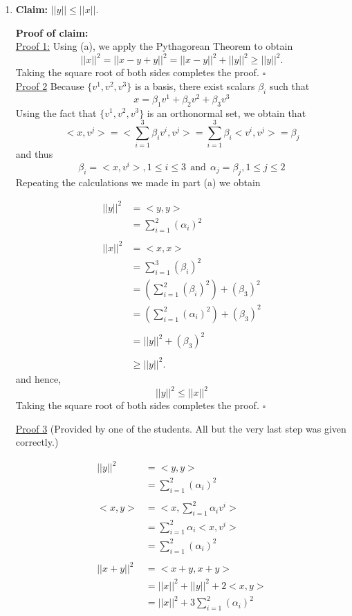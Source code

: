 \documentclass[letterpaper]{article}
\begin{document}
\begin{enumerate}
\newpage
\item \textbf{Claim:} $||y|| \le ||x|| $.


\textbf{Proof of claim:} \\
\noindent \underline{Proof 1:} Using (a), we apply the Pythagorean Theorem to obtain
$$||x||^2 = ||x-y + y||^2= ||x-y||^2 + ||y||^2 \ge ||y||^2.$$
Taking the square root of both sides completes the proof.
\hfill $\square$ \\

\noindent \underline{Proof 2} Because $\{v^1, v^2, v^3\}$ is a basis, there exist scalars $\beta_i$ such that
$$x=\beta_1 v^1 + \beta_2 v^2 + \beta_3 v^3$$
Using the fact that $\{v^1, v^2, v^3\}$ is an orthonormal set, we obtain that
$$<x,v^j> = <\sum_{i=1}^3 \beta_i v^i, v^j> = \sum_{i=1}^3 \beta_i< v^i, v^j> = \beta_j$$
and thus $$ \beta_i = <x,v^i>, 1\le i \le 3 ~~ \text{and}~~ \alpha_j = \beta_j,  1 \le j \le 2$$
Repeating the calculations we made in part (a) we obtain

\begin{align*}
 ||y||^2 &= <y,y> \\
 &= \sum_{i=1}^2 (\alpha_i)^2\\
 \\
 ||x||^2 &= <x,x> \\
 &= \sum_{i=1}^3 (\beta_i)^2\\
 &= \left( \sum_{i=1}^2 (\beta_i)^2  \right)+ (\beta_3)^2\\
  &= \left(\sum_{i=1}^2 (\alpha_i)^2 \right)+ (\beta_3)^2 \\
  \\
  & = ||y||^2 + (\beta_3)^2 \\
  \\
  & \ge ||y||^2.
\end{align*}
and hence,
$$||y||^2 \le ||x||^2$$
Taking the square root of both sides completes the proof. \hfill $\square$ \\

\newpage

\noindent \underline{Proof 3} (Provided by one of the students. All but the very last step was given correctly.)

\begin{align*}
 ||y||^2 &= <y,y> \\
 &= \sum_{i=1}^2 (\alpha_i)^2\\
 \\
 <x,y>&=<x, \sum_{i=1}^2 \alpha_i v^i> \\
 &= \sum_{i=1}^2 \alpha_i <x,  v^i> \\
 &= \sum_{i=1}^2 (\alpha_i)^2 \\
 \\
 ||x+y||^2 & = <x+y, x+y>\\
 &= ||x||^2 +||y||^2 + 2 <x,y>\\
 &= ||x||^2 + 3 \sum_{i=1}^2 (\alpha_i)^2
 \end{align*}


\end{enumerate}
\end{document}
